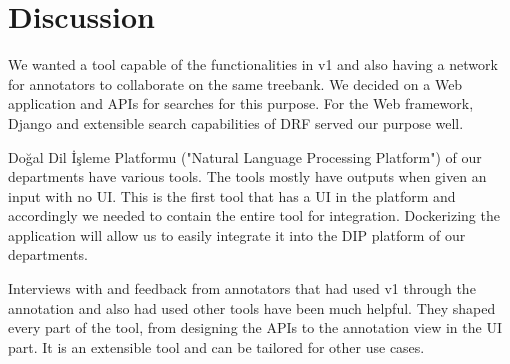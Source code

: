 \section{Discussion}
\label{sec:discussion}

We wanted a tool capable of the functionalities in \boat{} v1 and also having a network for annotators to collaborate on the same treebank.
We decided on a Web application and APIs for searches for this purpose.
For the Web framework, Django and extensible search capabilities of DRF served our purpose well.

Doğal Dil İşleme Platformu ("Natural Language Processing Platform") of our departments have various tools.
The tools mostly have outputs when given an input with no UI.
This is the first tool that has a UI in the platform and accordingly we needed to contain the entire tool for integration. %
Dockerizing the application will allow us to easily integrate it into the DIP platform of our departments.\cite{DIP}

Interviews with and feedback from annotators that had used \boat{} v1 through the \bountreebank{} annotation and also had used other tools have been much helpful.
They shaped every part of the tool, from designing the APIs to the annotation view in the UI part.
It is an extensible tool and can be tailored for other use cases.
